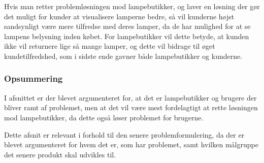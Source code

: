 Hvis man retter problemløsningen mod lampebutikker, og laver en løsning der gør det muligt for kunder at visualisere lamperne bedre, så vil kunderne højst sandsynligt være mere tilfredse med deres lamper, da de har mulighed for at se lampens belysning inden købet. For lampebutikker vil dette betyde, at kunden ikke vil returnere lige så mange lamper, og dette vil bidrage til øget kundetilfredshed, som i sidste ende gavner både lampebutikker og kunderne.

\subsubsection*{Opsummering}
I afsnittet er der blevet argumenteret for, at det er lampebutikker og brugere der bliver ramt af problemet, men at det vil være mest fordelagtigt at rette løsningen mod lampebutikker, da dette også løser problemet for brugerne.

Dette afsnit er relevant i forhold til den senere problemformulering, da der er blevet argumenteret for hvem det er, som har problemet, samt hvilken målgruppe det senere produkt skal udvikles til.
